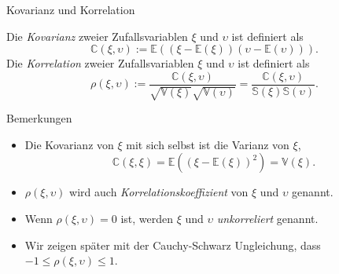 \documentclass[
  8pt,
  ignorenonframetext,
]{beamer}
\providecommand{\tightlist}{%
  \setlength{\itemsep}{0pt}\setlength{\parskip}{0pt}}
\newcommand{\ups}{\upsilon}
\begin{document}
\begin{frame}{Kovarianz und Korrelation}
\protect\hypertarget{kovarianz-und-korrelation}{}
\small
\begin{definition}
\justifying
Die \textit{Kovarianz} zweier Zufallsvariablen $\xi$ und $\ups$ ist definiert als
\begin{equation}
\mathbb{C}(\xi,\ups) :=
\mathbb{E}\left(\left(\xi - \mathbb{E}(\xi) \right)\left(\ups - \mathbb{E}(\ups)\right)\right).
\end{equation}
Die \textit{Korrelation} zweier Zufallsvariablen $\xi$ und $\ups$ ist definiert als
\begin{equation}
\rho(\xi,\ups)
:= \frac{\mathbb{C}(\xi,\ups)}{\sqrt{\mathbb{V}(\xi)}\sqrt{\mathbb{V}(\ups)}}
 = \frac{\mathbb{C}(\xi,\ups)}{\mathbb{S}(\xi){\mathbb{S}(\ups)}}.
\end{equation}
\end{definition}

\footnotesize

Bemerkungen

\begin{itemize}
\tightlist
\item
  Die Kovarianz von \(\xi\) mit sich selbst ist die Varianz von \(\xi\),
  \begin{equation}
  \mathbb{C}(\xi,\xi) =
  \mathbb{E}\left(\left(\xi - \mathbb{E}(\xi) \right)^2\right) =
  \mathbb{V}(\xi).
  \end{equation}
\item
  \(\rho(\xi,\ups)\) wird auch \textit{Korrelationskoeffizient} von
  \(\xi\) und \(\ups\) genannt.
\item
  Wenn \(\rho(\xi,\ups) = 0\) ist, werden \(\xi\) und \(\ups\)
  \textit{unkorreliert} genannt.
\item
  Wir zeigen später mit der Cauchy-Schwarz Ungleichung, dass
  \(-1 \le \rho(\xi,\ups) \le 1\).
\end{itemize}
\end{frame}
\end{document}
